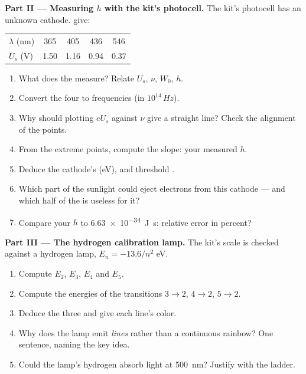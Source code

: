 \begin{problem}
\medskip
\noindent\textbf{Part II --- Measuring $h$ with the kit's photocell.}
The kit's photocell has an unknown cathode.  give:
\begin{center}\small
\begin{tabular}{lcccc}
$\lambda$ (\unit{nm}) & 365 & 405 & 436 & 546\\
$U_s$ (\unit{V}) & 1.50 & 1.16 & 0.94 & 0.37
\end{tabular}
\end{center}
\begin{enumerate}[resume]
  \item What does the  measure? Relate $U_s$, $\nu$, $W_0$, $h$.
  \item Convert the four  to frequencies (in $10^{14}\,\unit{Hz}$).
  \item Why should plotting $eU_s$ against $\nu$ give a straight line?
        Check the alignment of the points.
  \item From the extreme points, compute the slope: your measured $h$.
  \item Deduce the cathode's  (\unit{eV}),  and threshold .
  \item Which part of the sunlight could eject electrons from this
        cathode --- and which half of the  is useless for it?
  \item Compare your $h$ to \qty{6.63e-34}{J.s}: relative error in percent?
\end{enumerate}

\medskip
\noindent\textbf{Part III --- The hydrogen calibration lamp.}
The kit's  scale is checked against a hydrogen lamp,
$E_n = -13.6/n^2$ \unit{eV}.
\begin{enumerate}[resume]
  \item Compute $E_2$, $E_3$, $E_4$ and $E_5$.
  \item Compute the  energies of the transitions $3 \to 2$, $4 \to 2$, $5 \to 2$.
  \item Deduce the three  and give each line's color.
  \item Why does the lamp emit \emph{lines} rather than a continuous
        rainbow? One sentence, naming the key idea.
  \item Could the lamp's hydrogen absorb light at \qty{500}{nm}? Justify with the ladder.
\end{enumerate}


\end{problem}
